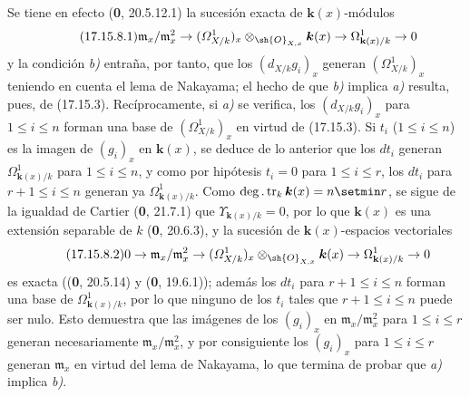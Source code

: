 Se tiene en efecto (\textbf 0, 20.5.12.1) la sucesión exacta de $\boldsymbol{k}(x)$-módulos
\[
\label{IV.17.15.8.1}
\tag{17.15.8.1}
\mathfrak m_x/\mathfrak m_x^2\to(\varOmega^1_{X/k})_x\otimes_{\sh{O}_{X,x}}\boldsymbol{k}(x)\to\Omega^1_{\mathbf{k}(x)/k}\to0
\]
y la condición \emph{b)} entraña, por tanto, que los $(d_{X/k}g_i)_x$ generan $(\varOmega^1_{X/k})_x$ teniendo en cuenta el lema de Nakayama; el hecho de que \emph{b)} implica \emph{a)} resulta, pues, de (17.15.3). Recíprocamente, si \emph{a)} se verifica, los $(d_{X/k}g_i)_x$ para $1\leq i\leq n$ forman una base de $(\varOmega^1_{X/k})_x$ en virtud de (17.15.3). Si $t_i$ ($1\leq i\leq n$) es la imagen de $(g_i)_x$ en $\boldsymbol{k}(x)$, se deduce de lo anterior que los $dt_i$ generan $\Omega^1_{\mathbf{k}(x)/k}$ para $1\leq i\leq n$, y como por hipótesis $t_i=0$ para $1\leq i\leq r$, los $dt_i$ para $r+1\leq i\leq n$ generan ya $\Omega^1_{\mathbf{k}(x)/k}$. Como $\deg.\operatorname{tr}_k \boldsymbol{k}(x)=n\setmin r$, se sigue de la igualdad de Cartier (\textbf 0, 21.7.1) que $\Upsilon_{\mathbf{k}(x)/k}=0$, por lo que $\boldsymbol{k}(x)$ es una extensión separable de $k$ (\textbf 0, 20.6.3), y la sucesión de $\boldsymbol{k}(x)$-espacios vectoriales
\[
\label{IV.17.15.8.2}
\tag{17.15.8.2}
0\to\mathfrak m_x/\mathfrak m_x^2\to(\varOmega^1_{X/k})_x\otimes_{\sh{O}_{X,x}}\boldsymbol{k}(x)\to\Omega^1_{\mathbf{k}(x)/k}\to0
\]
es exacta ((\textbf 0, 20.5.14) y (\textbf 0, 19.6.1)); además los $dt_i$ para $r+1\leq i\leq n$ forman una base de $\Omega^1_{\mathbf{k}(x)/k}$, por lo que ninguno de los $t_i$ tales que $r+1\leq i\leq n$ puede ser nulo. Esto demuestra que las imágenes de los $(g_i)_x$ en $\mathfrak m_x/\mathfrak m_x^2$ para $1\leq i\leq r$ generan necesariamente $\mathfrak m_x/\mathfrak m_x^2$, y por consiguiente los $(g_i)_x$ para $1\leq i\leq r$ generan $\mathfrak m_x$ en virtud del lema de Nakayama, lo que termina de probar que \emph{a)} implica \emph{b)}.

